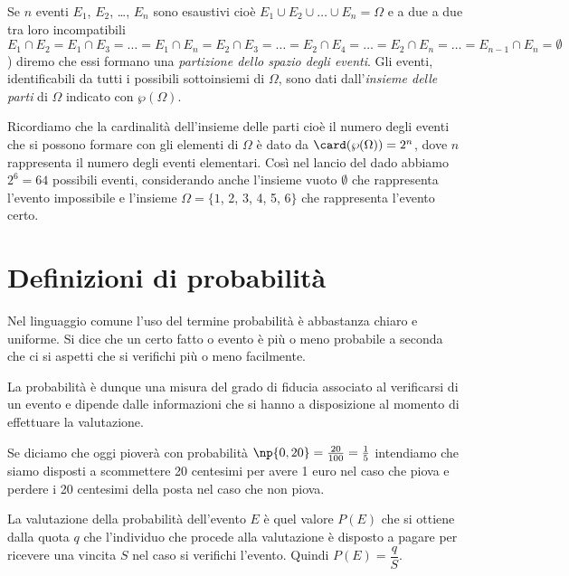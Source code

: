 \begin{definizione}
Se $n$ eventi $E_1$, $E_2$, \ldots, $E_n$ sono esaustivi cioè $E_1 \cup E_2 \cup \dots{} \cup E_n=\Omega$ e a due a due tra loro incompatibili $E_1\cap E_2 = E_1 \cap E_3 = \ldots = E_1 \cap E_n = E_2 \cap E_3 = \ldots = E_2 \cap E_4 = \ldots = E_2 \cap E_n = \ldots = E_{n-1}\cap E_n=\emptyset$) diremo che essi formano una \emph{partizione dello spazio degli eventi}. Gli eventi, identificabili da tutti i possibili sottoinsiemi di $\Omega$, sono dati dall'\emph{insieme delle parti} di $\Omega$ indicato con $\wp (\Omega).$
\end{definizione}

Ricordiamo che la cardinalità dell'insieme delle parti cioè il numero degli eventi che si possono formare con gli elementi di $\Omega$ è dato da $\card(\wp(\Omega ))=2^n$, dove $n$ rappresenta il numero degli eventi elementari. Così nel lancio del dado abbiamo $2^6=64$ possibili eventi, considerando anche l'insieme vuoto $\emptyset$ che rappresenta l'evento impossibile e l'insieme $\Omega =\{1$, 2, 3, 4, 5, $6\}$ che rappresenta l'evento certo.

\vspazio\ovalbox{\risolvii \ref{ese:9.1}, \ref{ese:9.2}, \ref{ese:9.3}, \ref{ese:9.4}, \ref{ese:9.5}}

\section{Definizioni di probabilità}

Nel linguaggio comune l'uso del termine probabilità è abbastanza chiaro e uniforme. Si dice che un certo fatto o evento è più o meno probabile a seconda che ci si aspetti che si verifichi più o meno facilmente.

La probabilità è dunque una misura del grado di fiducia associato al verificarsi di un evento e dipende dalle informazioni che si hanno a disposizione al momento di effettuare la valutazione.

Se diciamo che oggi pioverà con probabilità $\np{0,20}=\frac{20}{100}=\frac 1 5$ intendiamo che siamo disposti a scommettere 20 centesimi per avere 1 euro nel caso che piova e perdere i 20 centesimi della posta nel caso che non piova.

\begin{definizione}
La valutazione della probabilità dell'evento $E$ è quel valore $P(E)$ che si ottiene dalla quota $q$ che l'individuo che procede alla valutazione è disposto a pagare per ricevere una vincita $S$ nel caso si verifichi l'evento. Quindi $P(E)=\dfrac q S$.
\end{definizione}

